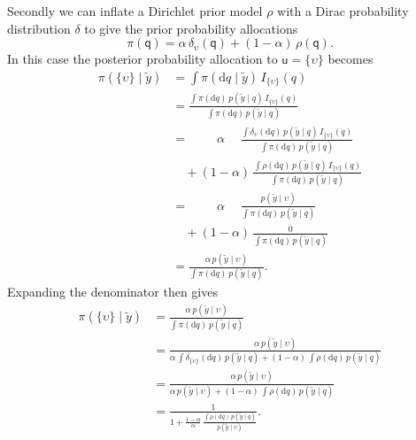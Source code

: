 \documentclass[
  letterpaper,
  DIV=11,
  numbers=noendperiod]{scrartcl}
\begin{document}
Secondly we can inflate a Dirichlet prior model \(\rho\) with a Dirac
probability distribution \(\delta\) to give the prior probability
allocations \[
\pi( \mathsf{q} ) =
  \alpha \, \delta_{ \upsilon }( \mathsf{q} )
+ (1 - \alpha) \, \rho( \mathsf{q} ).
\] In this case the posterior probability allocation to
\(\mathsf{u} = \{ \upsilon \}\) becomes \begin{align*}
\pi( \{ \upsilon \} \mid \tilde{y})
&=
\int \pi( \mathrm{d} q \mid \tilde{y} ) \,  I_{ \{ \upsilon \} }(q)
\\
&=
\frac{ \int \pi( \mathrm{d} q) \, p(\tilde{y} \mid q ) \,
                                  I_{ \{ \upsilon \} }(q) }
{ \int \pi( \mathrm{d} q) \, p(\tilde{y} \mid q ) }
\\
&=\quad
\quad\; \alpha \quad\;
\frac{ \int \delta_{ \upsilon }( \mathrm{d} q) \,
            p(\tilde{y} \mid q ) \, I_{ \{ \upsilon \} }(q) }
{ \int \pi( \mathrm{d} q) \, p(\tilde{y} \mid q ) }
\\
&\quad+
(1 - \alpha) \,
\frac{ \int \rho( \mathrm{d} q) \, p(\tilde{y} \mid q ) \,
                                   I_{ \{ \upsilon \} }(q) }
{ \int \pi( \mathrm{d} q) \, p(\tilde{y} \mid q ) }
\\
&=\quad
\quad\; \alpha \quad\;
\frac{ p(\tilde{y} \mid \upsilon ) }
{ \int \pi( \mathrm{d} q) \, p(\tilde{y} \mid q ) }
\\
&\quad+
(1 - \alpha) \,
\frac{ 0 }
{ \int \pi( \mathrm{d} q) \, p(\tilde{y} \mid q ) }
\\
&=
\frac{ \alpha \, p(\tilde{y} \mid \upsilon ) }
{ \int \pi( \mathrm{d} q) \, p(\tilde{y} \mid q ) }.
\end{align*} Expanding the denominator then gives \begin{align*}
\pi( \{ \upsilon \} \mid \tilde{y})
&=
\frac{ \alpha \, p(\tilde{y} \mid \upsilon ) }
{ \int \pi( \mathrm{d} q) \, p(\tilde{y} \mid q ) }
\\
&=
\frac{ \alpha \, p(\tilde{y} \mid \upsilon ) }
{   \alpha \,
    \int \delta_{ \{ \upsilon \} }( \mathrm{d} q) \, p(\tilde{y} \mid q )
  + (1 - \alpha) \,
    \int \rho( \mathrm{d} q) \, p(\tilde{y} \mid q) }
\\
&=
\frac{ \alpha \, p(\tilde{y} \mid \upsilon ) }
{ \alpha \, p(\tilde{y} \mid \upsilon )
 + (1 - \alpha) \, \int \rho( \mathrm{d} q) \, p(\tilde{y} \mid q) }
\\
&=
\frac{ 1 }
{ 1 + \frac{ 1 - \alpha }{ \alpha } \,
\frac{ \int \rho( \mathrm{d} q) \, p(\tilde{y} \mid q) }
     { p(\tilde{y} \mid \upsilon ) } }.
\end{align*}
\end{document}
